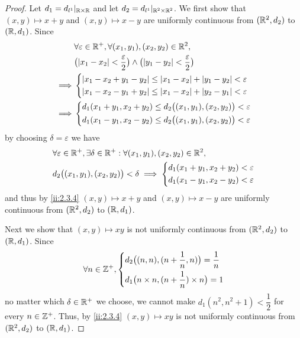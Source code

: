 \begin{proof}
  Let \(d_1 = d_{l^1}|_{\mathbb{R} \times \mathbb{R}}\) and let \(d_2 = d_{l^1}|_{\mathbb{R}^2 \times \mathbb{R}^2}\).
  We first show that \((x, y) \mapsto x + y\) and \((x, y) \mapsto x - y\) are uniformly continuous from \((\mathbb{R}^2, d_2)\) to \((\mathbb{R}, d_1)\).
  Since
  \begin{align*}
             & \forall \varepsilon \in \R^+, \forall (x_1, y_1), (x_2, y_2) \in \R^2,                                      \\
             & \big(\abs{x_1 - x_2} < \dfrac{\varepsilon}{2}\big) \land \big(\abs{y_1 - y_2} < \dfrac{\varepsilon}{2}\big) \\
    \implies & \begin{dcases}
                 \abs{x_1 - x_2 + y_1 - y_2} \leq \abs{x_1 - x_2} + \abs{y_1 - y_2} < \varepsilon \\
                 \abs{x_1 - x_2 - y_1 + y_2} \leq \abs{x_1 - x_2} + \abs{y_2 - y_1} < \varepsilon \\
               \end{dcases}                            \\
    \implies & \begin{dcases}
                 d_1(x_1 + y_1, x_2 + y_2) \leq d_2\big((x_1, y_1), (x_2, y_2)\big) < \varepsilon \\
                 d_1(x_1 - y_1, x_2 - y_2) \leq d_2\big((x_1, y_1), (x_2, y_2)\big) < \varepsilon
               \end{dcases}
  \end{align*}
  by choosing \(\delta = \varepsilon\) we have
  \begin{align*}
     & \forall \varepsilon \in \mathbb{R}^+, \exists \delta \in \mathbb{R}^+ : \forall (x_1, y_1), (x_2, y_2) \in \mathbb{R}^2, \\
     & d_2\big((x_1, y_1), (x_2, y_2)\big) < \delta \implies \begin{dcases}
                                                               d_1(x_1 + y_1, x_2 + y_2) < \varepsilon \\
                                                               d_1(x_1 - y_1, x_2 - y_2) < \varepsilon
                                                             \end{dcases}
  \end{align*}
  and thus by \cref{ii:2.3.4} \((x, y) \mapsto x + y\) and \((x, y) \mapsto x - y\) are uniformly continuous from \((\mathbb{R}^2, d_2)\) to \((\mathbb{R}, d_1)\).

  Next we show that \((x, y) \mapsto xy\) is not uniformly continuous from \((\mathbb{R}^2, d_2)\) to \((\mathbb{R}, d_1)\).
  Since
  \[
    \forall n \in \mathbb{Z}^+, \begin{dcases}
      d_2\big((n, n), (n + \dfrac{1}{n}, n)\big) = \dfrac{1}{n} \\
      d_1\big(n \times n, (n + \dfrac{1}{n}) \times n\big) = 1
    \end{dcases}
  \]
  no matter which \(\delta \in \mathbb{R}^+\) we choose, we cannot make \(d_1(n^2, n^2 + 1) < \dfrac{1}{2}\) for every \(n \in \mathbb{Z}^+\).
  Thus, by \cref{ii:2.3.4} \((x, y) \mapsto xy\) is not uniformly continuous from \((\mathbb{R}^2, d_2)\) to \((\mathbb{R}, d_1)\).


\end{proof}
